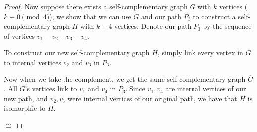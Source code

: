\documentclass[11pt]{article}
\begin{document}
\begin{enumerate}
\begin{enumerate}
\begin{proof}
          Now suppose there exists a self-complementary graph \(G\) with \(k\) vertices (\(k \equiv 0 \pmod 4\)), we show that we can use \(G\) and our path \(P_3\) to construct a self-complementary graph \(H\) with \(k + 4\) vertices.  Denote our path \(P_3\) by the sequence of vertices \(v_1-v_2-v_3-v_4\).

          To construct our new self-complementary graph \(H\), simply link every vertex in \(G\) to internal vertices \(v_2\) and \(v_3\) in \(P_3\).

          Now when we take the complement, we get the same self-complementary graph \(\overline{G}\).  All \(\overline{G}\)'s vertices link to \(v_1\) and \(v_4\) in \(\overline{P_3}\).  Since \(v_1,v_4\) are internal vertices of our new path, and \(v_2,v_3\) were internal vertices of our original path, we have that \(H\) is isomorphic to \(\overline{H}\).

          \begin{minipage}{0.4\textwidth}
            \centering
          \end{minipage} \(\cong\)
          \begin{minipage}{0.4\textwidth}
            \centering
          \end{minipage}


\end{proof}
\end{enumerate}
\end{enumerate}
\end{document}

